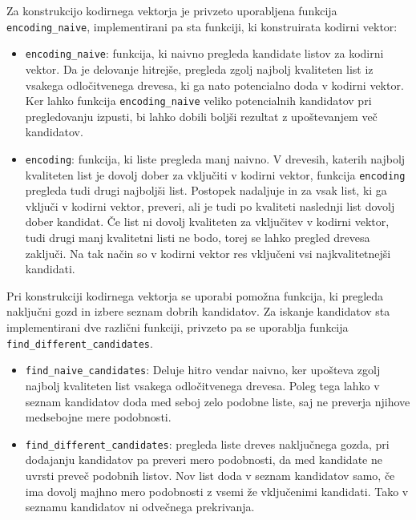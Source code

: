 \documentclass[12pt,a4paper,twoside]{article}
\theoremstyle{definition} %
\theoremstyle{plain} %
\numberwithin{equation}{section}  %
\begin{document}
Za konstrukcijo kodirnega vektorja je privzeto uporabljena funkcija \texttt{encoding\_\-naive},
implementirani pa sta funkciji, ki konstruirata kodirni vektor:

\begin{itemize}
	\item \texttt{encoding\_\-naive}: funkcija, ki naivno pregleda kandidate listov za kodirni vektor. 
	Da je delovanje hitrejše, pregleda zgolj najbolj kvaliteten list iz vsakega odločitvenega drevesa, ki ga nato potencialno doda v kodirni vektor.
	Ker lahko funkcija \texttt{encoding\_\-naive} veliko potencialnih kandidatov pri pregledovanju izpusti, bi lahko dobili boljši rezultat z upoštevanjem več kandidatov.

	\item \texttt{encoding}: funkcija, ki liste pregleda manj naivno.
	V drevesih, katerih najbolj kvaliteten list je dovolj dober za vključiti v kodirni vektor, funkcija \texttt{encoding} pregleda tudi drugi najboljši list.
	Postopek nadaljuje in za vsak list, ki ga vključi v kodirni vektor, preveri, ali je tudi po kvaliteti naslednji list dovolj dober kandidat.
	Če list ni dovolj kvaliteten za vključitev v kodirni vektor, tudi drugi manj kvalitetni listi ne bodo, torej se lahko pregled drevesa zaključi.
	Na tak način so v kodirni vektor res vključeni vsi najkvalitetnejši kandidati.
\end{itemize}

Pri konstrukciji kodirnega vektorja se uporabi pomožna funkcija, ki pregleda naključni gozd in izbere seznam dobrih kandidatov.
Za iskanje kandidatov sta implementirani dve različni funkciji, privzeto pa se uporablja funkcija \texttt{find\_\-different\_\-candidates}.

\begin{itemize}
	\item \texttt{find\_\-naive\_\-candidates}:
	Deluje hitro vendar naivno, ker upošteva zgolj najbolj kvaliteten list vsakega odločitvenega drevesa.
	Poleg tega lahko v seznam kandidatov doda med seboj zelo podobne liste, saj ne preverja njihove medsebojne mere podobnosti.

	\item \texttt{find\_\-different\_\-candidates}: pregleda liste dreves naključnega gozda, 
	pri dodajanju kandidatov pa preveri mero podobnosti, da med kandidate ne uvrsti preveč podobnih listov.
	Nov list doda v seznam kandidatov samo, če ima dovolj majhno mero podobnosti z vsemi že vključenimi kandidati.
	Tako v seznamu kandidatov ni odvečnega prekrivanja.
\end{itemize}
\end{document}
